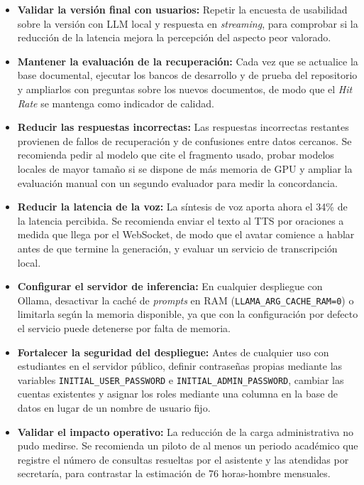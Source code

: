 \begin{itemize}
    \item \textbf{Validar la versión final con usuarios:} Repetir la encuesta de usabilidad sobre la versión con LLM local y respuesta en \textit{streaming}, para comprobar si la reducción de la latencia mejora la percepción del aspecto peor valorado.

    \item \textbf{Mantener la evaluación de la recuperación:} Cada vez que se actualice la base documental, ejecutar los bancos de desarrollo y de prueba del repositorio y ampliarlos con preguntas sobre los nuevos documentos, de modo que el \textit{Hit Rate} se mantenga como indicador de calidad.

    \item \textbf{Reducir las respuestas incorrectas:} Las respuestas incorrectas restantes provienen de fallos de recuperación y de confusiones entre datos cercanos. Se recomienda pedir al modelo que cite el fragmento usado, probar modelos locales de mayor tamaño si se dispone de más memoria de GPU y ampliar la evaluación manual con un segundo evaluador para medir la concordancia.

    \item \textbf{Reducir la latencia de la voz:} La síntesis de voz aporta ahora el 34\% de la latencia percibida. Se recomienda enviar el texto al TTS por oraciones a medida que llega por el WebSocket, de modo que el avatar comience a hablar antes de que termine la generación, y evaluar un servicio de transcripción local.

    \item \textbf{Configurar el servidor de inferencia:} En cualquier despliegue con Ollama, desactivar la caché de \textit{prompts} en RAM (\texttt{LLAMA\_\allowbreak{}ARG\_\allowbreak{}CACHE\_\allowbreak{}RAM=0}) o limitarla según la memoria disponible, ya que con la configuración por defecto el servicio puede detenerse por falta de memoria.

    \item \textbf{Fortalecer la seguridad del despliegue:} Antes de cualquier uso con estudiantes en el servidor público, definir contraseñas propias mediante las variables \texttt{INITIAL\_\allowbreak{}USER\_\allowbreak{}PASSWORD} e \texttt{INITIAL\_\allowbreak{}ADMIN\_\allowbreak{}PASSWORD}, cambiar las cuentas existentes y asignar los roles mediante una columna en la base de datos en lugar de un nombre de usuario fijo.

    \item \textbf{Validar el impacto operativo:} La reducción de la carga administrativa no pudo medirse. Se recomienda un piloto de al menos un periodo académico que registre el número de consultas resueltas por el asistente y las atendidas por secretaría, para contrastar la estimación de 76 horas-hombre mensuales.


\end{itemize}
